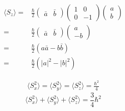    \begin{align*}
       \langle S_z\rangle =& 
       \frac{\hbar}{2}
       \begin{pmatrix}
           \bar a & \bar b
       \end{pmatrix}
       \begin{pmatrix}
           1 & 0 \\
           0 & -1
       \end{pmatrix}
       \begin{pmatrix}
           a \\ b 
       \end{pmatrix}\\
       =&
       \frac{\hbar}{2}
        \begin{pmatrix}
           \bar a & \bar b
       \end{pmatrix}
       \begin{pmatrix}
           a \\ -b 
       \end{pmatrix}\\
       =&\frac{\hbar}{2}(a\bar a  - b\bar b )\\
       =& \frac{\hbar}{2} (|a|^2-|b|^2)
   \end{align*}

   \begin{align*}
       \langle S^2_x\rangle=
       \langle S^2_y\rangle=
       \langle S^2_z\rangle=
       \frac{\hbar^2}{4}
   \end{align*}
   $$
   \langle S^2_x\rangle + \langle S^2_y\rangle +\langle S^2_z\rangle
   =\frac{3}{4}\hbar^2
   $$

